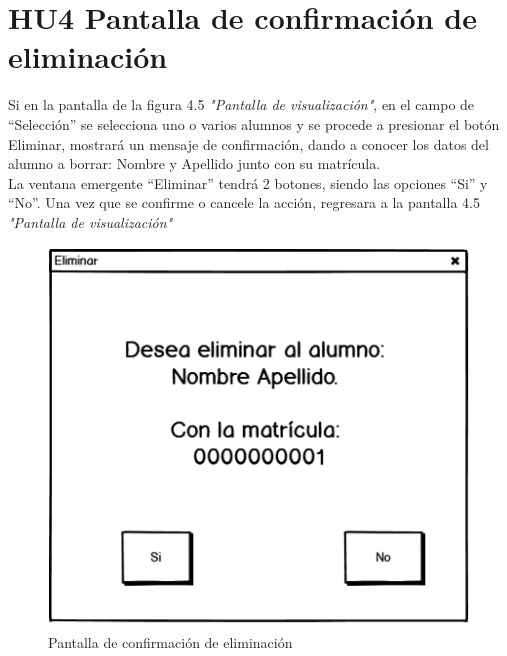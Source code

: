 

\section{HU4 Pantalla de confirmación de eliminación}

Si en la pantalla de la figura 4.5 \emph{"Pantalla de visualización"}, en el campo de “Selección” se selecciona uno o varios alumnos y se procede a presionar el botón Eliminar, mostrará un mensaje de confirmación, dando a conocer los datos del alumno a borrar: Nombre y Apellido junto con su matrícula. \\
La ventana emergente “Eliminar” tendrá 2 botones, siendo las opciones “Si” y “No”.
Una vez que se confirme o cancele la acción, regresara a la pantalla 4.5 \emph{"Pantalla de visualización"}

\begin{figure}[h]
	\centering
	\includegraphics[scale=0.5]{./HistoriasUsuario/imagenes/IHU7.png}
	\caption{Pantalla de confirmación de eliminación}
\end{figure}
